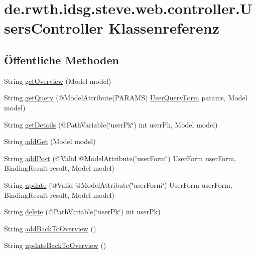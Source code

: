 \hypertarget{classde_1_1rwth_1_1idsg_1_1steve_1_1web_1_1controller_1_1_users_controller}{\section{de.\-rwth.\-idsg.\-steve.\-web.\-controller.\-Users\-Controller Klassenreferenz}
\label{classde_1_1rwth_1_1idsg_1_1steve_1_1web_1_1controller_1_1_users_controller}
}
\subsection*{Öffentliche Methoden}
\begin{DoxyCompactItemize}
\item 
String \hyperlink{classde_1_1rwth_1_1idsg_1_1steve_1_1web_1_1controller_1_1_users_controller_a6f592fd1d3bc63030cfd6f4e1f043eae}{get\-Overview} (Model model)
\item 
String \hyperlink{classde_1_1rwth_1_1idsg_1_1steve_1_1web_1_1controller_1_1_users_controller_a2b700470c909df9427bfb2f7643fde7c}{get\-Query} (@Model\-Attribute(P\-A\-R\-A\-M\-S) \hyperlink{classde_1_1rwth_1_1idsg_1_1steve_1_1web_1_1dto_1_1_user_query_form}{User\-Query\-Form} params, Model model)
\item 
String \hyperlink{classde_1_1rwth_1_1idsg_1_1steve_1_1web_1_1controller_1_1_users_controller_a6f611a88c2de2588de01f61eb1ffafe2}{get\-Details} (@Path\-Variable(\char`\"{}user\-Pk\char`\"{}) int user\-Pk, Model model)
\item 
String \hyperlink{classde_1_1rwth_1_1idsg_1_1steve_1_1web_1_1controller_1_1_users_controller_a80a02c68a44e0fc976487e23667e6347}{add\-Get} (Model model)
\item 
String \hyperlink{classde_1_1rwth_1_1idsg_1_1steve_1_1web_1_1controller_1_1_users_controller_a02bc241cc89206a63450ddebb3ae9c81}{add\-Post} (@Valid @Model\-Attribute(\char`\"{}user\-Form\char`\"{}) User\-Form user\-Form, Binding\-Result result, Model model)
\item 
String \hyperlink{classde_1_1rwth_1_1idsg_1_1steve_1_1web_1_1controller_1_1_users_controller_aef3fe375aad8e93c93fa0998e1eecbd4}{update} (@Valid @Model\-Attribute(\char`\"{}user\-Form\char`\"{}) User\-Form user\-Form, Binding\-Result result, Model model)
\item 
String \hyperlink{classde_1_1rwth_1_1idsg_1_1steve_1_1web_1_1controller_1_1_users_controller_a941a7406304ab5f10b02af12ef7adc9b}{delete} (@Path\-Variable(\char`\"{}user\-Pk\char`\"{}) int user\-Pk)
\item 
String \hyperlink{classde_1_1rwth_1_1idsg_1_1steve_1_1web_1_1controller_1_1_users_controller_a78784bda6ddbcf5fb5e1667f540d85c5}{add\-Back\-To\-Overview} ()
\item 
String \hyperlink{classde_1_1rwth_1_1idsg_1_1steve_1_1web_1_1controller_1_1_users_controller_a66190839ad13e63c2a1710b30806a7c9}{update\-Back\-To\-Overview} ()
\end{DoxyCompactItemize}


